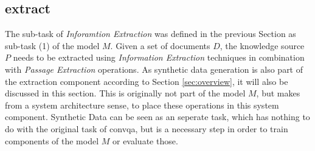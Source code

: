




\subsection{extract}
\label{subsec:extract}

The sub-task of \textit{Inforamtion Extraction} was defined in the previous Section as sub-task (1) of the model $M$. Given a set of documents $D$, the knowledge source $P$ needs to be extracted using \textit{Information Extraction} techniques in combination with \textit{Passage Extraction} operations. As synthetic data generation is also part of the extraction component according to Section \ref{sec:overview}, it will also be discussed in this section. This is originally not part of the model $M$, but makes from a system architecture sense, to place these operations in this system component. Synthetic Data can be seen as an seperate task, which has nothing to do with the original task of \gls{convqa}, but is a necessary step in order to train components of the model $M$ or evaluate those.

